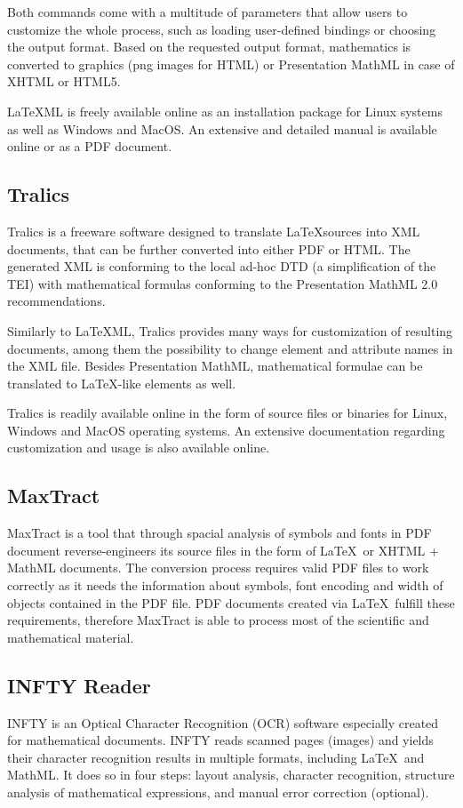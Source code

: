 \documentclass[11pt,oneside,final]{fithesis2}
\begin{document}
Both commands come with a multitude of parameters that allow users to customize the whole process, such as loading user-defined bindings or choosing the output format. Based on the requested output format, mathematics is converted to graphics (png images for HTML) or Presentation MathML in case of XHTML or HTML5. 

\LaTeX ML is freely available online as an installation package for Linux systems as well as Windows and MacOS. An extensive and detailed manual is available online or as a PDF document.

\subsection{Tralics}
Tralics\cite{tralics:grimm2003}\cite{dml:Grimm2010} is a freeware software designed to translate \LaTeX sources into XML documents, that can be further converted into either PDF or HTML. The generated XML is conforming to the local ad-hoc DTD (a simplification of the TEI) with mathematical formulas conforming to the Presentation MathML 2.0 recommendations.

Similarly to \LaTeX ML, Tralics provides many ways for customization of resulting documents, among them the possibility to change element and attribute names in the XML file. Besides Presentation MathML, mathematical formulae can be translated to \LaTeX -like   elements as well.

Tralics is readily available online in the form of source files or binaries for Linux, Windows and MacOS operating systems. An extensive documentation regarding customization and usage is also available online. 

\subsection{MaxTract}
MaxTract\cite{baker2012maxtract} is a tool that through spacial analysis of symbols and fonts in PDF document reverse-engineers its source files in the form of \LaTeX\ or XHTML + MathML documents. The conversion process requires valid PDF files to work correctly as it needs the information about symbols, font encoding and width of objects contained in the PDF file. PDF documents created via \LaTeX\ fulfill these requirements, therefore MaxTract is able to process most of the scientific and mathematical material.


\subsection{INFTY Reader}
INFTY\cite{suzuki2003infty} is an Optical Character Recognition (OCR) software especially created for mathematical documents. INFTY reads scanned pages (images) and yields their character recognition results in multiple formats, including \LaTeX\ and MathML. It does so in four steps: layout analysis, character recognition, structure analysis of mathematical expressions, and manual error correction (optional). 
\end{document}
